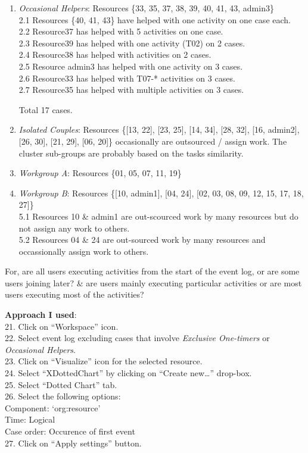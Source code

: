 \documentclass[]{article}
\begin{document}
\begin{enumerate}
\def\labelenumi{\arabic{enumi}.}
\setcounter{enumi}{1}
\item
  \emph{Occasional Helpers}: Resources \{33, 35, 37, 38, 39, 40, 41, 43,
  admin3\}\\2.1 Resources \{40, 41, 43\} have helped with one activity
  on one case each.\\2.2 Resource37 has helped with 5 activities on one
  case.\\2.3 Resource39 has helped with one activity (T02) on 2
  cases.\\2.4 Resource38 has helped with activities on 2 cases.\\2.5
  Resource admin3 has helped with one activity on 3 cases.\\2.6
  Resource33 has helped with T07-* activities on 3 cases.\\2.7
  Resource35 has helped with multiple activities on 3 cases.

  Total 17 cases.
\item
  \emph{Isolated Couples}: Resources \{{[}13, 22{]}, {[}23, 25{]},
  {[}14, 34{]}, {[}28, 32{]}, {[}16, admin2{]}, {[}26, 30{]}, {[}21,
  29{]}, {[}06, 20{]}\} occasionally are outsourced / assign work. The
  cluster sub-groups are probably based on the tasks similarity.
\item
  \emph{Workgroup A}: Resources \{01, 05, 07, 11, 19\}
\item
  \emph{Workgroup B}: Resources \{{[}10, admin1{]}, {[}04, 24{]}, {[}02,
  03, 08, 09, 12, 15, 17, 18, 27{]}\}\\5.1 Resources 10 \& admin1 are
  out-scourced work by many resources but do not assign any work to
  others.\\5.2 Resources 04 \& 24 are out-sourced work by many resources
  and occassionally assign work to others.
\end{enumerate}

For, are all users executing activities from the start of the event log,
or are some users joining later? \& are users mainly executing
particular activities or are most users executing most of the
activities?

\textbf{Approach I used}:\\21. Click on ``Workspace'' icon.\\22. Select
event log excluding cases that involve \emph{Exclusive One-timers} or
\emph{Occasional Helpers}.\\23. Click on ``Visualize'' icon for the
selected resource.\\24. Select ``XDottedChart'' by clicking on ``Create
new\ldots{}'' drop-box.\\25. Select ``Dotted Chart'' tab.\\26. Select
the following options:\\ Component: `org:resource'\\ Time: Logical\\
Case order: Occurence of first event\\27. Click on ``Apply settings''
button.
\end{document}
